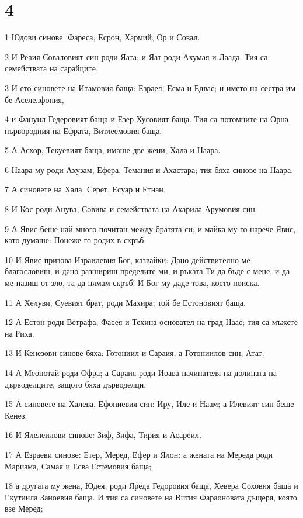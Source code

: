 \chapter{4}

\par 1 Юдови синове: Фареса, Есрон, Хармий, Ор и Совал.
\par 2 И Реаия Соваловият син роди Яата; и Яат роди Ахумая и Лаада. Тия са семействата на сарайците.
\par 3 И ето синовете на Итамовия баща: Езраел, Есма и Едвас; и името на сестра им бе Аселелфония,
\par 4 и Фануил Гедеровият баща и Езер Хусовият баща. Тия са потомците на Орна първородния на Ефрата, Витлеемовия баща.
\par 5 А Асхор, Текуевият баща, имаше две жени, Хала и Наара.
\par 6 Наара му роди Ахузам, Ефера, Темания и Ахастара; тия бяха синове на Наара.
\par 7 А синовете на Хала: Серет, Есуар и Етнан.
\par 8 И Кос роди Анува, Совива и семействата на Ахарила Арумовия син.
\par 9 А Явис беше най-много почитан между братята си; и майка му го нарече Явис, като думаше: Понеже го родих в скръб.
\par 10 И Явис призова Израилевия Бог, казвайки: Дано действително ме благословиш, и дано разшириш пределите ми, и ръката Ти да бъде с мене, и да ме пазиш от зло, та да нямам скръб! И Бог му даде това, което поиска.
\par 11 А Хелуви, Суевият брат, роди Махира; той бе Естоновият баща.
\par 12 А Естон роди Ветрафа, Фасея и Техина основател на град Наас; тия са мъжете на Риха.
\par 13 И Кенезови синове бяха: Готониил и Сараия; а Готониилов син, Атат.
\par 14 А Меонотай роди Офра; а Сараия роди Иоава начинателя на долината на дърводелците, защото бяха дърводелци.
\par 15 А синовете на Халева, Ефониевия син: Иру, Иле и Наам; а Илевият син беше Кенез.
\par 16 И Ялелеилови синове: Зиф, Зифа, Тирия и Асареил.
\par 17 А Езраеви синове: Етер, Меред, Ефер и Ялон: а жената на Мереда роди Мариама, Самая и Есва Естемовия баща;
\par 18 а другата му жена, Юдея, роди Яреда Гедоровия баща, Хевера Соховия баща и Екутиила Заноевия баща. И тия са синовете на Вития Фараоновата дъщеря, която взе Меред;

